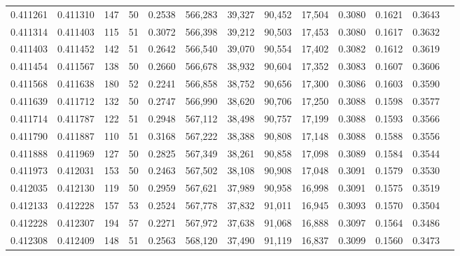 \begin{tabular}{rrrrrrrrrrrrr}
0.411261 & 0.411310 &   147 &  50 &                                     0.2538 & 566,283 &  39,327 &  90,452 &  17,504 & 0.3080 & 0.1621 & 0.3643 \\
0.411314 & 0.411403 &   115 &  51 &                                     0.3072 & 566,398 &  39,212 &  90,503 &  17,453 & 0.3080 & 0.1617 & 0.3632 \\
0.411403 & 0.411452 &   142 &  51 &                                     0.2642 & 566,540 &  39,070 &  90,554 &  17,402 & 0.3082 & 0.1612 & 0.3619 \\
0.411454 & 0.411567 &   138 &  50 &                                     0.2660 & 566,678 &  38,932 &  90,604 &  17,352 & 0.3083 & 0.1607 & 0.3606 \\
0.411568 & 0.411638 &   180 &  52 &                                     0.2241 & 566,858 &  38,752 &  90,656 &  17,300 & 0.3086 & 0.1603 & 0.3590 \\
0.411639 & 0.411712 &   132 &  50 &                                     0.2747 & 566,990 &  38,620 &  90,706 &  17,250 & 0.3088 & 0.1598 & 0.3577 \\
0.411714 & 0.411787 &   122 &  51 &                                     0.2948 & 567,112 &  38,498 &  90,757 &  17,199 & 0.3088 & 0.1593 & 0.3566 \\
0.411790 & 0.411887 &   110 &  51 &                                     0.3168 & 567,222 &  38,388 &  90,808 &  17,148 & 0.3088 & 0.1588 & 0.3556 \\
0.411888 & 0.411969 &   127 &  50 &                                     0.2825 & 567,349 &  38,261 &  90,858 &  17,098 & 0.3089 & 0.1584 & 0.3544 \\
0.411973 & 0.412031 &   153 &  50 &                                     0.2463 & 567,502 &  38,108 &  90,908 &  17,048 & 0.3091 & 0.1579 & 0.3530 \\
0.412035 & 0.412130 &   119 &  50 &                                     0.2959 & 567,621 &  37,989 &  90,958 &  16,998 & 0.3091 & 0.1575 & 0.3519 \\
0.412133 & 0.412228 &   157 &  53 &                                     0.2524 & 567,778 &  37,832 &  91,011 &  16,945 & 0.3093 & 0.1570 & 0.3504 \\
0.412228 & 0.412307 &   194 &  57 &                                     0.2271 & 567,972 &  37,638 &  91,068 &  16,888 & 0.3097 & 0.1564 & 0.3486 \\
0.412308 & 0.412409 &   148 &  51 &                                     0.2563 & 568,120 &  37,490 &  91,119 &  16,837 & 0.3099 & 0.1560 & 0.3473 \\

\end{tabular}
